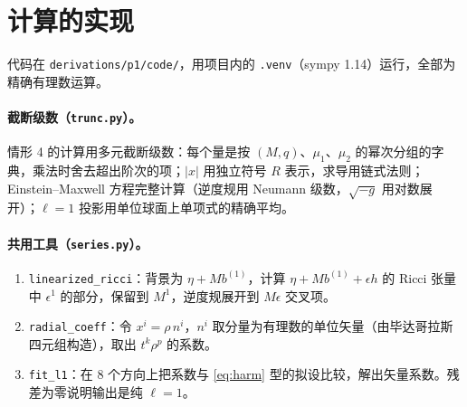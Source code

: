 \documentclass[11pt,a4paper]{ctexart}
\numberwithin{equation}{section}
\begin{document}
\appendix
\section{计算的实现}
\label{app:code}

代码在 \texttt{derivations/p1/code/}，用项目内的 \texttt{.venv}（sympy 1.14）运行，全部为精确有理数运算。

\paragraph{截断级数（\texttt{trunc.py}）。}情形 4 的计算用多元截断级数：每个量是按 $(M,q)$、$\mu_1$、$\mu_2$ 的幂次分组的字典，乘法时舍去超出阶次的项；$|x|$ 用独立符号 $R$ 表示，求导用链式法则；Einstein--Maxwell 方程完整计算（逆度规用 Neumann 级数，$\sqrt{-g}$ 用对数展开）；$\ell=1$ 投影用单位球面上单项式的精确平均。

\paragraph{共用工具（\texttt{series.py}）。}
\begin{enumerate}
\item \texttt{linearized\_ricci}：背景为 $\eta+Mb^{(1)}$，计算 $\eta+Mb^{(1)}+\epsilon h$ 的 Ricci 张量中 $\epsilon^1$ 的部分，保留到 $M^1$，逆度规展开到 $M\epsilon$ 交叉项。
\item \texttt{radial\_coeff}：令 $x^i=\rho\,n^i$，$n^i$ 取分量为有理数的单位矢量（由毕达哥拉斯四元组构造），取出 $t^k\rho^p$ 的系数。
\item \texttt{fit\_l1}：在 8 个方向上把系数与 \eqref{eq:harm} 型的拟设比较，解出矢量系数。残差为零说明输出是纯 $\ell=1$。
\end{enumerate}
\end{document}
